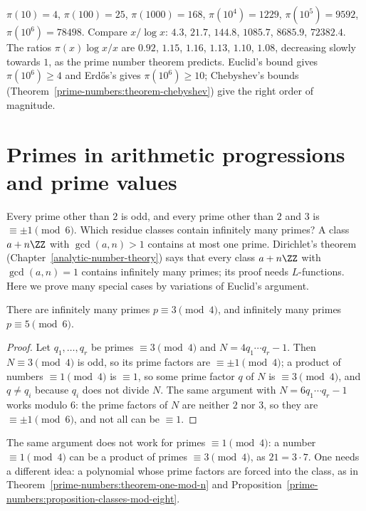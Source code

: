 \begin{example}\label{prime-numbers:example-small-pi}
$\pi(10) = 4$, $\pi(100) = 25$, $\pi(1000) = 168$, $\pi(10^4) = 1229$, $\pi(10^5) = 9592$, $\pi(10^6) = 78498$. Compare $x/\log x$: $4.3$, $21.7$, $144.8$, $1085.7$, $8685.9$, $72382.4$. The
ratios $\pi(x)\log x/x$ are $0.92$, $1.15$, $1.16$, $1.13$, $1.10$, $1.08$, decreasing slowly towards $1$, as the prime number theorem predicts. Euclid's bound gives $\pi(10^6) \geq 4$ and
Erd\H{o}s's gives $\pi(10^6) \geq 10$; Chebyshev's bounds (Theorem~\ref{prime-numbers:theorem-chebyshev}) give the right order of magnitude.
\end{example}

\section{Primes in arithmetic progressions and prime values}\label{prime-numbers:section-progressions}

Every prime other than $2$ is odd, and every prime other than $2$ and $3$ is $\equiv \pm 1 \pmod 6$. Which residue classes contain infinitely many primes? A class $a + n\ZZ$ with
$\gcd(a, n) > 1$ contains at most one prime. Dirichlet's theorem (Chapter~\ref{analytic-number-theory}) says that every class $a + n\ZZ$ with $\gcd(a, n) = 1$ contains infinitely many primes; its
proof needs $L$-functions. Here we prove many special cases by variations of Euclid's argument.

\begin{proposition}\label{prime-numbers:proposition-minus-one-classes}
There are infinitely many primes $p \equiv 3 \pmod 4$, and infinitely many primes $p \equiv 5 \pmod 6$.
\end{proposition}

\begin{proof}
Let $q_1, \ldots, q_r$ be primes $\equiv 3 \pmod 4$ and $N = 4q_1 \cdots q_r - 1$. Then $N \equiv 3 \pmod 4$ is odd, so its prime factors are $\equiv \pm 1 \pmod 4$; a product of numbers
$\equiv 1 \pmod 4$ is $\equiv 1$, so some prime factor $q$ of $N$ is $\equiv 3 \pmod 4$, and $q \neq q_i$ because $q_i$ does not divide $N$. The same argument with $N = 6q_1 \cdots q_r - 1$ works modulo
$6$: the prime factors of $N$ are neither $2$ nor $3$, so they are $\equiv \pm 1 \pmod 6$, and not all can be $\equiv 1$.
\end{proof}

\begin{counterexample}\label{prime-numbers:counterexample-plus-one}
The same argument does not work for primes $\equiv 1 \pmod 4$: a number $\equiv 1 \pmod 4$ can be a product of primes $\equiv 3 \pmod 4$, as $21 = 3 \cdot 7$. One needs a different idea: a
polynomial whose prime factors are forced into the class, as in Theorem~\ref{prime-numbers:theorem-one-mod-n} and Proposition~\ref{prime-numbers:proposition-classes-mod-eight}.
\end{counterexample}

